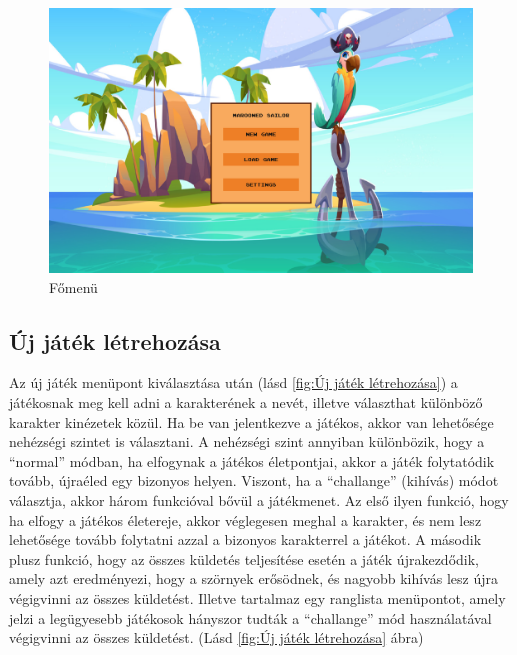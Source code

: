\begin{figure}[hbt]
    \centering
    \includegraphics[width=14.0truecm]{images/mainmenu.png}
    \caption{Főmenü}
    \label{fig:Főmenü}
\end{figure}


\subsection{Új játék létrehozása}
 Az új játék menüpont kiválasztása után (lásd \ref{fig:Új játék létrehozása}) a játékosnak meg kell adni a karakterének a nevét, illetve választhat különböző karakter kinézetek közül. Ha be van jelentkezve a játékos, akkor van lehetősége nehézségi szintet is választani.
A nehézségi szint annyiban különbözik, hogy a ``normal'' módban, ha elfogynak a játékos életpontjai, akkor a játék folytatódik tovább, újraéled egy bizonyos helyen. Viszont, ha a ``challange'' (kihívás) módot választja, akkor három funkcióval bővül a játékmenet. Az első ilyen funkció, hogy ha elfogy a játékos életereje, akkor véglegesen meghal a karakter, és nem lesz lehetősége tovább folytatni azzal a bizonyos karakterrel a játékot. A második plusz funkció, hogy az összes küldetés teljesítése esetén a játék újrakezdődik, amely azt eredményezi, hogy a szörnyek erősödnek, és nagyobb kihívás lesz újra végigvinni az összes küldetést. Illetve tartalmaz egy ranglista menüpontot, amely jelzi a legügyesebb játékosok hányszor tudták a ``challange'' mód használatával végigvinni az összes küldetést. (Lásd \ref{fig:Új játék létrehozása} ábra)


